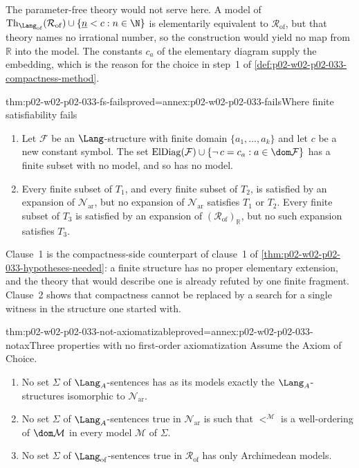 The parameter-free theory would not serve here.  A model of
\(\operatorname{Th}_{\Lang_{\mathrm{of}}}(\mathcal R_{\mathrm{of}})\cup
\{\underline n<c:n\in\N\}\) is elementarily equivalent to
\(\mathcal R_{\mathrm{of}}\), but that theory names no irrational number, so
the construction would yield no map from \(\mathbb R\) into the model.  The
constants \(c_a\) of the elementary diagram supply the embedding, which is the
reason for the choice in step~1 of
\cref{def:p02-w02-p02-033-compactness-method}.

\begin{hblemma}{thm:p02-w02-p02-033-fs-fails}{proved=annex:p02-w02-p02-033-fails}{Where finite satisfiability fails}
\begin{enumerate}
  \item Let \(\mathcal F\) be an \(\Lang\)-structure with finite domain
        \(\{a_1,\ldots,a_k\}\) and let \(c\) be a new constant symbol.  The set
        \(\operatorname{ElDiag}(\mathcal F)\cup\{\neg\,c=c_a:a\in\dom\mathcal F\}\)
        has a finite subset with no model, and so has no model.
  \item Every finite subset of \(T_1\), and every finite subset of \(T_2\),
        is satisfied by an expansion of \(\mathcal N_{\mathrm{ar}}\), but no
        expansion of \(\mathcal N_{\mathrm{ar}}\) satisfies \(T_1\) or
        \(T_2\).  Every finite subset of \(T_3\) is satisfied by an expansion
        of \((\mathcal R_{\mathrm{of}})_{\mathbb R}\), but no such expansion
        satisfies \(T_3\).
\end{enumerate}
\end{hblemma}

Clause~1 is the compactness-side counterpart of clause~1 of
\cref{thm:p02-w02-p02-033-hypotheses-needed}: a finite structure has no proper
elementary extension, and the theory that would describe one is already
refuted by one finite fragment.  Clause~2 shows that compactness cannot be
replaced by a search for a single witness in the structure one started with.

\begin{hbcorollary}{thm:p02-w02-p02-033-not-axiomatizable}{proved=annex:p02-w02-p02-033-notax}{Three properties with no first-order axiomatization}
Assume the Axiom of Choice.
\begin{enumerate}
  \item No set \(\Sigma\) of \(\Lang_A\)-sentences has as its models exactly
        the \(\Lang_A\)-structures isomorphic to \(\mathcal N_{\mathrm{ar}}\).
  \item No set \(\Sigma\) of \(\Lang_A\)-sentences true in
        \(\mathcal N_{\mathrm{ar}}\) is such that \(<^{\mathcal M}\) is a
        well-ordering of \(\dom\mathcal M\) in every model \(\mathcal M\) of
        \(\Sigma\).
  \item No set \(\Sigma\) of \(\Lang_{\mathrm{of}}\)-sentences true in
        \(\mathcal R_{\mathrm{of}}\) has only Archimedean models.
\end{enumerate}
\end{hbcorollary}

